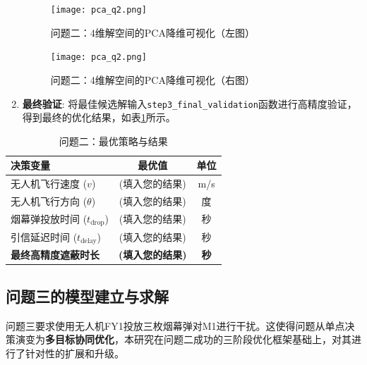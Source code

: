 \documentclass[12pt]{article}
\newcommand{\code}[1]{\texttt{#1}} %
\begin{document}
\begin{CJK}{UTF8}{gbsn}
\begin{enumerate}
			\begin{figure}[H]
				\centering
				\begin{minipage}{0.48\textwidth}
					\centering
					\texttt{[image: pca\_q2.png]} %
					\caption{问题二：4维解空间的PCA降维可视化（左图）}
					\label{fig:pca_q2_left}
				\end{minipage}
				\hfill %
				\begin{minipage}{0.48\textwidth}
					\centering
					\texttt{[image: pca\_q2.png]} %
					\caption{问题二：4维解空间的PCA降维可视化（右图）}
					\label{fig:pca_q2_right}
				\end{minipage}
			\end{figure}
			
			\item \textbf{最终验证}: 将最佳候选解输入\code{step3\_final\_validation}函数进行高精度验证，得到最终的优化结果，如表\ref{tab:results_q2}所示。
		\end{enumerate}
		
		\begin{table}[H]
			\centering
			\caption{问题二：最优策略与结果}
			\label{tab:results_q2}
			\begin{tabular}{@{}lcc@{}}
				\toprule
				决策变量               & 最优值      & 单位 \\ \midrule
				无人机飞行速度 ($v$)     & (填入您的结果) & m/s  \\
				无人机飞行方向 ($\theta$)    & (填入您的结果) & 度   \\
				烟幕弹投放时间 ($t_{\text{drop}}$) & (填入您的结果) & 秒   \\
				引信延迟时间 ($t_{\text{delay}}$)   & (填入您的结果) & 秒   \\ \midrule
				\textbf{最终高精度遮蔽时长} & \textbf{(填入您的结果)} & \textbf{秒}   \\ \bottomrule
			\end{tabular}
		\end{table}
		
		\subsection{问题三的模型建立与求解}
		
		
		问题三要求使用无人机FY1投放三枚烟幕弹对M1进行干扰。这使得问题从单点决策演变为\textbf{多目标协同优化}，本研究在问题二成功的三阶段优化框架基础上，对其进行了针对性的扩展和升级。
		

\end{CJK}
\end{document}
